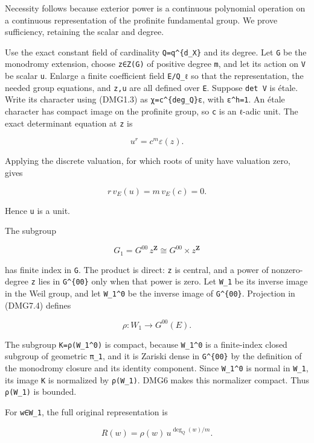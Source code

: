 \documentclass[
]{report}
\begin{document}
Necessity follows because exterior power is a continuous polynomial
operation on a continuous representation of the profinite fundamental
group. We prove sufficiency, retaining the scalar and degree.

Use the exact constant field of cardinality \texttt{Q=q\^{}\{d\_X\}} and
its degree. Let \texttt{G} be the monodromy extension, choose
\texttt{z∈Z(G)} of positive degree \texttt{m}, and let its action on
\texttt{V} be scalar \texttt{u}. Enlarge a finite coefficient field
\texttt{E/Q\_ℓ} so that the representation, the needed group equations,
and \texttt{z,u} are all defined over \texttt{E}. Suppose
\texttt{det\ V} is étale. Write its character using (DMG1.3) as
\texttt{χ=c\^{}\{deg\_Q\}ε}, with \texttt{ε\^{}h=1}. An étale character
has compact image on the profinite group, so \texttt{c} is an
\texttt{ℓ}-adic unit. The exact determinant equation at \texttt{z} is

\[
u^r=c^m\varepsilon(z).
\tag{DMG7.2}
\]

Applying the discrete valuation, for which roots of unity have valuation
zero, gives

\[
r\,v_E(u)=m\,v_E(c)=0.
\tag{DMG7.3}
\]

Hence \texttt{u} is a unit.

The subgroup

\[
G_1=G^{00}\,z^{\mathbf Z}\cong G^{00}\times z^{\mathbf Z}
\tag{DMG7.4}
\]

has finite index in \texttt{G}. The product is direct: \texttt{z} is
central, and a power of nonzero-degree \texttt{z} lies in
\texttt{G\^{}\{00\}} only when that power is zero. Let \texttt{W\_1} be
its inverse image in the Weil group, and let \texttt{W\_1\^{}0} be the
inverse image of \texttt{G\^{}\{00\}}. Projection in (DMG7.4) defines

\[
\rho:W_1\longrightarrow G^{00}(E).
\tag{DMG7.5}
\]

The subgroup \texttt{K=ρ(W\_1\^{}0)} is compact, because
\texttt{W\_1\^{}0} is a finite-index closed subgroup of geometric
\texttt{π\_1}, and it is Zariski dense in \texttt{G\^{}\{00\}} by the
definition of the monodromy closure and its identity component. Since
\texttt{W\_1\^{}0} is normal in \texttt{W\_1}, its image \texttt{K} is
normalized by \texttt{ρ(W\_1)}. DMG6 makes this normalizer compact. Thus
\texttt{ρ(W\_1)} is bounded.

For \texttt{w∈W\_1}, the full original representation is

\[
R(w)=\rho(w)\,u^{\deg_Q(w)/m}.
\tag{DMG7.6}
\]
\end{document}
